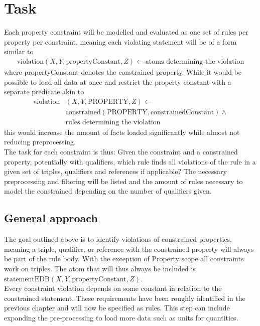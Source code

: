 \documentclass[hyperref,bachelorofscience,fleqn]{cgvpub}
\begin{document}
\section{Task}
Each property constraint will be modelled and evaluated as one set of rules per property per constraint, meaning each violating statement will be of a form similar to
\begin{equation}
\begin{split}
\text{violation}(X, Y, \text{propertyConstant}, Z) \leftarrow \text{atoms determining the violation}
\end{split}
\end{equation}
where propertyConstant denotes the constrained property. While it would be possible to load all data at once and restrict the property constant with a separate predicate akin to
\begin{equation}
\begin{split}
\text{violation}&(X, Y, \text{PROPERTY}, Z) \leftarrow \\
&\text{constrained}(\text{PROPERTY}, \text{constrainedConstant}) \wedge{} \\
&\text{rules determining the violation}
\end{split}
\end{equation}
this would increase the amount of facts loaded significantly while almost not reducing preprocessing.\\

The task for each constraint is thus: Given the constraint and a constrained property, potentially with qualifiers, which rule finds all violations of the rule in a given set of triples, qualifiers and references if applicable? The necessary preprocessing and filtering will be listed and the amount of rules necessary to model the constrained depending on the number of qualifiers given.

\subsection{General approach}
The goal outlined above is to identify violations of constrained properties, meaning a triple, qualifier, or reference with the constrained property will always be part of the rule body. With the exception of Property scope all constraints work on triples. The atom that will thus always be included is \(\text{statementEDB}(X, Y, \text{propertyConstant}, Z)\).\\

Every constraint violation depends on some constant in relation to the constrained statement. These requirements have been roughly identified in the previous chapter and will now be specified as rules. This step can include expanding the pre-processing to load more data such as units for quantities.\\
\end{document}
